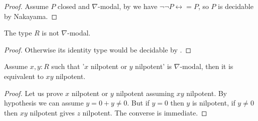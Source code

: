 \begin{proof}
Assume $P$ closed and $\nabla$-modal, by  we have $\neg\neg P \leftrightarrow = P$, so $P$ is decidable by Nakayama.
\end{proof}

\begin{corollary}
The type $R$ is not $\nabla$-modal.
\end{corollary}

\begin{proof}
Otherwise its identity type would be decidable by .
\end{proof}

\begin{lemma}
Assume $x,y:R$ such that '$x$ nilpotent or $y$ nilpotent' is $\nabla$-modal, then it is equivalent to $xy$ nilpotent.
\end{lemma}

\begin{proof}
Let us prove $x$ nilpotent or $y$ nilpotent assuming $xy$ nilpotent. By hypothesis we can assume $y=0+y\not=0$. But if $y=0$ then $y$ is nilpotent, if $y\not=0$ then $xy$ nilpotent gives $z$ nilpotent. The converse is immediate.
\end{proof}